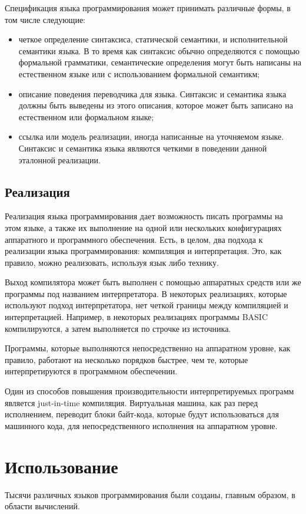 Спецификация языка программирования может принимать различные формы, в том
числе следующие:
\begin{itemize}
  \item четкое определение синтаксиса, статической семантики, и исполнительной
    семантики языка. В то время как синтаксис обычно определяются с помощью
    формальной грамматики, семантические определения могут быть написаны на
    естественном языке или с использованием формальной семантикм;
  \item описание поведения переводчика для языка. Синтаксис и семантика языка
    должны быть выведены из этого описания, которое может быть записано на
    естественном или формальном языке;
  \item ссылка или модель реализации, иногда написанные на уточняемом языке.
    Синтаксис и семантика языка являются четкими в поведении данной эталонной
    реализации.
\end{itemize}

\section{Реализация}
Реализация языка программирования дает возможность писать программы на этом
языке, а также их выполнение на одной или нескольких конфигурациях аппаратного
и программного обеспечения. Есть, в целом, два подхода к реализации языка
программирования: компиляция и интерпретация. Это, как правило, можно
реализовать, используя язык либо технику.

Выход компилятора может быть выполнен с помощью аппаратных средств или же
программы под названием интерпретатора. В некоторых реализациях, которые
используют подход интерпретатора, нет четкой границы между компиляцией и
интерпретацией. Например, в некоторых реализациях программы BASIC
компилируются, а затем выполняется по строчке из источника.

Программы, которые выполняются непосредственно на аппаратном уровне, как
правило, работают на несколько порядков быстрее, чем те, которые
интерпретируются в программном обеспечении.

Один из способов повышения производительности интерпретируемых программ
является just-in-time компиляция. Виртуальная машина, как раз перед
исполнением, переводит блоки байт-кода, которые будут использоваться для
машинного кода, для непосредственного исполнения на аппаратном уровне.

\chapter{Использование}
Тысячи различных языков программирования были созданы, главным образом, в
области вычислений.

